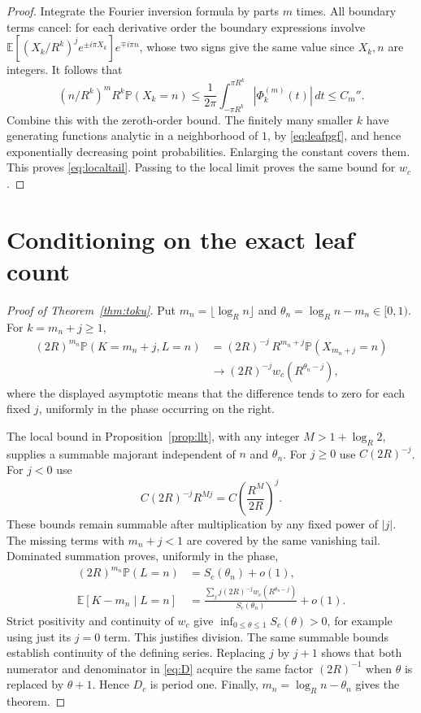 \documentclass[11pt,a4paper]{article}
\theoremstyle{remark}\newtheorem{remark}[theorem]{Remark}
\newcommand{\E}{\mathbb E}\newcommand{\Pp}{\mathbb P}
\begin{document}
\begin{proof}
Integrate the Fourier inversion formula by parts $m$ times. All boundary terms cancel: for each derivative order the boundary expressions involve
$\E[(X_k/R^k)^j e^{\pm i\pi X_k}]e^{\mp i\pi n}$, whose two signs give the same value since $X_k,n$ are integers. It follows that
\[
(n/R^k)^m R^k\Pp(X_k=n)
\le\frac1{2\pi}\int_{-\pi R^k}^{\pi R^k}|\Phi_k^{(m)}(t)|\,dt
\le C_m''.
\]
Combine this with the zeroth-order bound. The finitely many smaller $k$ have generating functions analytic in a neighborhood of $1$, by \eqref{eq:leafpgf}, and hence exponentially decreasing point probabilities. Enlarging the constant covers them. This proves \eqref{eq:localtail}. Passing to the local limit proves the same bound for $w_c$.
\end{proof}

\section{Conditioning on the exact leaf count}
\begin{proof}[Proof of Theorem~\ref{thm:toku}]
Put $m_n=\lfloor\log_R n\rfloor$ and $\theta_n=\log_Rn-m_n\in[0,1)$. For $k=m_n+j\ge1$,
\begin{align*}
(2R)^{m_n}\Pp(K=m_n+j,L=n)
&=(2R)^{-j}\,R^{m_n+j}\Pp(X_{m_n+j}=n)\\
&\longrightarrow (2R)^{-j}w_c(R^{\theta_n-j}),
\end{align*}
where the displayed asymptotic means that the difference tends to zero for each fixed $j$, uniformly in the phase occurring on the right.

The local bound in Proposition~\ref{prop:llt}, with any integer $M>1+\log_R2$, supplies a summable majorant independent of $n$ and $\theta_n$. For $j\ge0$ use $C(2R)^{-j}$. For $j<0$ use
\[
C(2R)^{-j}R^{Mj}=C\left(\frac{R^M}{2R}\right)^j.
\]
These bounds remain summable after multiplication by any fixed power of $|j|$. The missing terms with $m_n+j<1$ are covered by the same vanishing tail. Dominated summation proves, uniformly in the phase,
\begin{align*}
(2R)^{m_n}\Pp(L=n)&=S_c(\theta_n)+o(1),\\
\E[K-m_n\mid L=n]
&=\frac{\sum_j j(2R)^{-j}w_c(R^{\theta_n-j})}{S_c(\theta_n)}+o(1).
\end{align*}
Strict positivity and continuity of $w_c$ give
$\inf_{0\le\theta\le1}S_c(\theta)>0$, for example using just its $j=0$ term. This justifies division. The same summable bounds establish continuity of the defining series. Replacing $j$ by $j+1$ shows that both numerator and denominator in \eqref{eq:D} acquire the same factor $(2R)^{-1}$ when $\theta$ is replaced by $\theta+1$. Hence $D_c$ is period one. Finally, $m_n=\log_Rn-\theta_n$ gives the theorem.
\end{proof}
\end{document}
